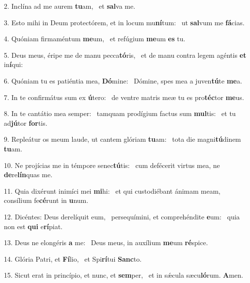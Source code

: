 2. Inclína ad me aurem \textbf{tu}am, \ast\  et \textbf{sal}va me.\

3. Esto mihi in Deum protectórem, et in locum mu\textbf{ní}tum: \ast\  ut \textbf{sal}vum me \textbf{fá}cias.\

4. Quóniam firmaméntum \textbf{me}um, \ast\  et refúgium \textbf{me}um \textbf{es} tu.\

5. Deus meus, éripe me de manu pecca\textbf{tó}ris, \ast\  et de manu contra legem agéntis \textbf{et} in\textbf{í}qui:\

6. Quóniam tu es patiéntia mea, \textbf{Dó}mine: \ast\  Dómine, spes mea a juven\textbf{tú}te \textbf{me}a.\

7. In te confirmátus sum ex \textbf{ú}tero: \ast\  de ventre matris meæ tu es pro\textbf{téc}tor \textbf{me}us.\

8. In te cantátio mea semper: \dag\  tamquam prodígium factus sum \textbf{mul}tis: \ast\  et tu ad\textbf{jú}tor \textbf{for}tis.\

9. Repleátur os meum laude, ut cantem glóriam \textbf{tu}am: \ast\  tota die magni\textbf{tú}dinem \textbf{tu}am.\

10. Ne projícias me in témpore senec\textbf{tú}tis: \ast\  cum defécerit virtus mea, ne \textbf{de}re\textbf{lín}quas me.\

11. Quia dixérunt inimíci mei \textbf{mi}hi: \ast\  et qui custodiébant ánimam meam, consílium fe\textbf{cé}runt in \textbf{u}num.\

12. Dicéntes: Deus derelíquit eum, \dag\  persequímini, et comprehéndite \textbf{e}um: \ast\  quia non est \textbf{qui} e\textbf{rí}piat.\

13. Deus ne elongéris \textbf{a} me: \ast\  Deus meus, in auxílium \textbf{me}um \textbf{ré}spice.\

14. Glória Patri, et \textbf{Fí}lio, \ast\  et Spi\textbf{rí}tui \textbf{Sanc}to.\

15. Sicut erat in princípio, et nunc, et \textbf{sem}per, \ast\  et in sǽcula sæcu\textbf{ló}rum. \textbf{A}men.\

